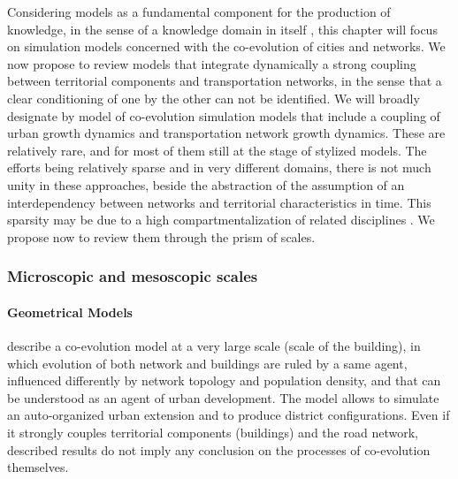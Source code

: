 \documentclass[11pt]{article}
\begin{document}
Considering models as a fundamental component for the production of knowledge, in the sense of a knowledge domain in itself \citep{raimbault2017applied}, this chapter will focus on simulation models concerned with the co-evolution of cities and networks. We now propose to review models that integrate dynamically a strong coupling between territorial components and transportation networks, in the sense that a clear conditioning of one by the other can not be identified. We will broadly designate by model of co-evolution simulation models that include a coupling of urban growth dynamics and transportation network growth dynamics. These are relatively rare, and for most of them still at the stage of stylized models. The efforts being relatively sparse and in very different domains, there is not much unity in these approaches, beside the abstraction of the assumption of an interdependency between networks and territorial characteristics in time. This sparsity may be due to a high compartmentalization of related disciplines \citep{raimbault2017models}. We propose now to review them through the prism of scales.



\subsubsection{Microscopic and mesoscopic scales}


\paragraph{Geometrical Models}

\cite{achibet2014model} describe a co-evolution model at a very large scale (scale of the building), in which evolution of both network and buildings are ruled by a same agent, influenced differently by network topology and population density, and that can be understood as an agent of urban development. The model allows to simulate an auto-organized urban extension and to produce district configurations. Even if it strongly couples territorial components (buildings) and the road network, described results do not imply any conclusion on the processes of co-evolution themselves.
\end{document}
